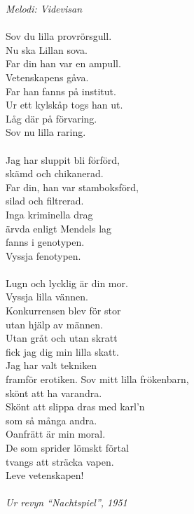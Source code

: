 {\footnotesize\textit{Melodi: Videvisan}}\\
\\
Sov du lilla provrörsgull.\\
Nu ska Lillan sova.\\
Far din han var en ampull.\\
Vetenskapens gåva.\\
Far han fanns på institut.\\
Ur ett kylskåp togs han ut.\\
Låg där på förvaring.\\
Sov nu lilla raring.\\
\\
Jag har sluppit bli förförd,\\
skämd och chikanerad.\\
Far din, han var stamboksförd,\\
silad och filtrerad.\\
Inga kriminella drag\\
ärvda enligt Mendels lag\\
fanns i genotypen.\\
Vyssja fenotypen.\\
\\
Lugn och lycklig är din mor.\\
Vyssja lilla vännen.\\
Konkurrensen blev för stor\\
utan hjälp av männen.\\
Utan gråt och utan skratt\\
fick jag dig min lilla skatt.\\
Jag har valt tekniken\\
framför erotiken.
\newpage
Sov mitt lilla frökenbarn,\\
skönt att ha varandra.\\
Skönt att slippa dras med karl'n\\
som så många andra.\\
Oanfrätt är min moral.\\
De som sprider lömskt förtal\\
tvangs att sträcka vapen.\\
Leve vetenskapen!\\
\\
{\footnotesize\textit{Ur revyn “Nachtspiel”, 1951}}
